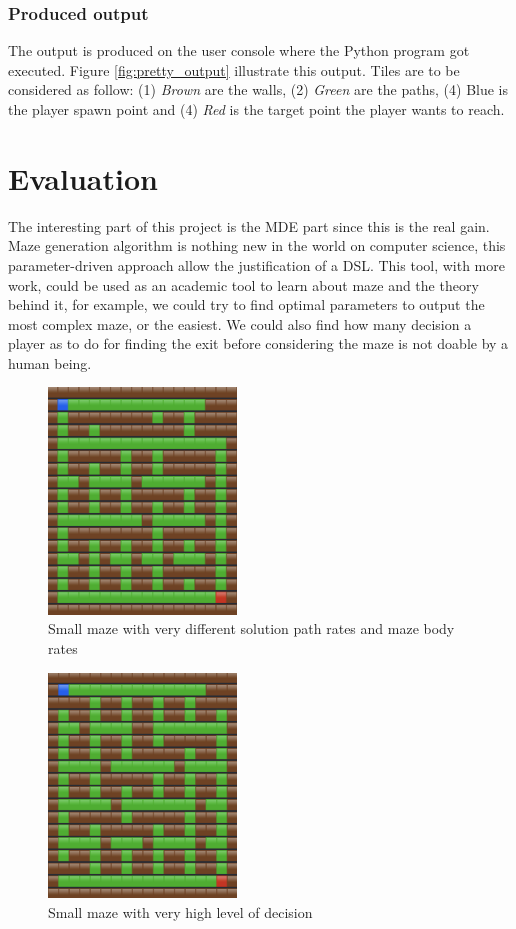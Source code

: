 \documentclass[review]{elsarticle}
\begin{document}
\subsubsection{Produced output}
The output is produced on the user console where the Python program got executed. Figure \ref{fig:pretty_output} illustrate this output. Tiles are to be considered as follow: (1) \textit{Brown} are the walls, (2) \textit{Green} are the paths, (4) Blue is the player spawn point and (4) \textit{Red} is the target point the player wants to reach.

\section{Evaluation}
The interesting part of this project is the MDE part since this is the real gain. Maze generation algorithm is nothing new in the world on computer science, this parameter-driven approach allow the justification of a DSL. This tool, with more work, could be used as an academic tool to learn about maze and the theory behind it, for example, we could try to find optimal parameters to output the most complex maze, or the easiest. We could also find how many decision a player as to do for finding the exit before considering the maze is not doable by a human being.

\begin{figure}
	\includegraphics[width=50mm]{maze_diff.png}
	\centering
	\caption{Small maze with very different solution path rates and maze body rates}
	\label{fig:maze_diff}
\end{figure}

\begin{figure}
	\includegraphics[width=50mm]{maze_dr.png}
	\centering
	\caption{Small maze with very high level of decision}
	\label{fig:maze_dr}
\end{figure}
\end{document}
